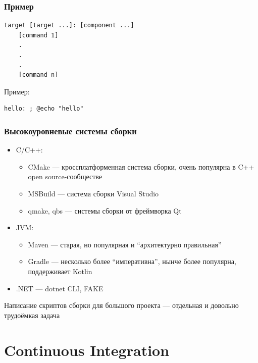 \documentclass{../../slides-style}
\begin{document}
    \begin{frame}[fragile]
        \frametitle{Пример}
        \begin{footnotesize}
            \begin{verbatim}
target [target ...]: [component ...]
    [command 1]
    .
    .
    .
    [command n]
            \end{verbatim}
        \end{footnotesize}
        Пример:
        \begin{footnotesize}
            \begin{verbatim}
hello: ; @echo "hello"
            \end{verbatim}
        \end{footnotesize}
    \end{frame}

    \begin{frame}
        \frametitle{Высокоуровневые системы сборки}
        \begin{itemize}
            \item C/C++:
            \begin{itemize}
                \item CMake --- кроссплатформенная система сборки, очень популярна в C++ open source-сообществе
                \item MSBuild --- система сборки Visual Studio
                \item qmake, qbs --- системы сборки от фреймворка Qt
            \end{itemize}
            \item JVM:
            \begin{itemize}
                \item Maven --- старая, но популярная и \enquote{архитектурно правильная}
                \item Gradle --- несколько более \enquote{императивна}, нынче более популярна, поддерживает Kotlin
            \end{itemize}
            \item .NET --- dotnet CLI, FAKE
        \end{itemize}
        Написание скриптов сборки для большого проекта --- отдельная и довольно трудоёмкая задача
    \end{frame}

    \section{Continuous Integration}
\end{document}
